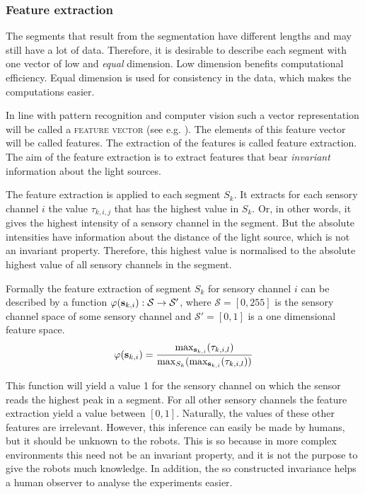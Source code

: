 \subsubsection{Feature extraction}


The segments that result from the segmentation have different lengths and may still have a lot of data. Therefore, it is desirable to describe each segment with one vector of low and {\em equal} dimension. Low dimension benefits computational efficiency. Equal dimension is used for consistency in the data, which makes the computations easier.

In line with pattern recognition and computer vision such a vector representation will be called a {\scshape feature vector} (see e.g. \citealt{fu:1976}). The elements of this feature vector will be called features. The extraction of the features is called feature extraction. The aim of the feature extraction is to extract features that bear {\em invariant} information about the light sources.

The feature extraction is applied to each segment $S_k$. It extracts for each sensory channel $i$ the value $\tau_{k,i,j}$ that has the highest value in $S_k$. Or, in other words, it gives the highest intensity of a sensory channel in the segment. But the absolute intensities have information about the distance of the light source, which is not an invariant property. Therefore, this highest value is normalised to the absolute highest value of all sensory channels in the segment. 

Formally the feature extraction of segment $S_k$ for sensory channel $i$ can be described by a function $\varphi({\bf s}_{k,i}):{\mathcal{S}} \rightarrow {\mathcal{S}'}$, where ${\mathcal{S}}=[0, 255]$ is the sensory channel space of some sensory channel and ${\mathcal S}'=[0, 1]$ is a one dimensional feature space.
\begin{eqnarray}
\varphi({\bf s}_{k,i}) = \frac{\max_{{\bf s}_{k,i}} (\tau_{k,i,l})}{\max_{S_k} (\max_{{\bf s}_{k,i}} (\tau_{k,i,l}))}
\label{e:sc-norm}
\end{eqnarray}

This function will yield a value 1 for the sensory channel on which the sensor reads the highest peak in a segment. For all other sensory channels the feature extraction yield a value between $[0, 1]$. Naturally, the values of these other features are irrelevant. However, this inference can easily be made by humans, but it should be unknown to the robots. This is so because in more complex environments this need not be an invariant property, and it is not the purpose to give the robots much knowledge. In addition, the so constructed invariance helps a human observer to analyse the experiments easier. 

